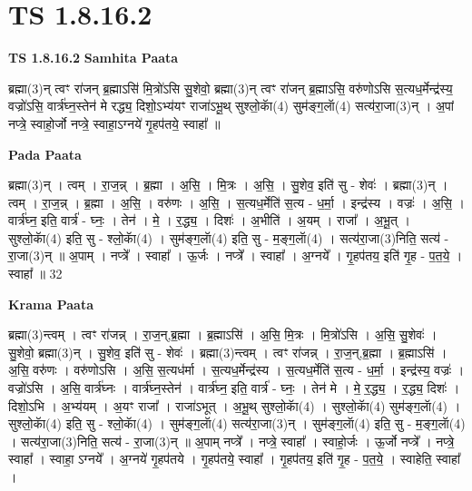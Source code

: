 \documentclass[17pt]{extarticle}
\begin{document}
\section{ TS 1.8.16.2 }

\textbf{TS 1.8.16.2 } \newline
\textbf{Samhita Paata} \newline

ब्रह्मा(3)न् त्वꣳ रा॑जन् ब्र॒ह्माऽसि॑ मि॒त्रो॑ऽसि सु॒शेवो॒ ब्रह्मा(3)न् त्वꣳ रा॑जन् ब्र॒ह्माऽसि॒ वरु॑णोऽसि स॒त्यध॒र्मेन्द्र॑स्य॒ वज्रो॑ऽसि॒ वार्त्र॑घ्न॒स्तेन॑ मे रद्ध्य॒ दिशो॒ऽभ्य॑यꣳ राजा॑ऽभू॒थ् सुश्लो॒काॅ(4) सुम॑ङ्ग॒लाॅ(4) सत्य॑रा॒जा(3)न् । अ॒पां नप्त्रे॒ स्वाहो॒र्जो नप्त्रे॒ स्वाहा॒ऽग्नये॑ गृ॒हप॑तये॒ स्वाहा᳚ ॥ \newline

\textbf{Pada Paata} \newline

ब्रह्मा(3)न् । त्वम् । रा॒ज॒न्न् । ब्र॒ह्मा । अ॒सि॒ । मि॒त्रः । अ॒सि॒ । सु॒शेव॒ इति॑ सु - शेवः॑ । ब्रह्मा(3)न् । त्वम् । रा॒ज॒न्न् । ब्र॒ह्मा । अ॒सि॒ । वरु॑णः । अ॒सि॒ । स॒त्यध॒र्मेति॑ स॒त्य - ध॒र्मा॒ । इन्द्र॑स्य । वज्रः॑ । अ॒सि॒ । वार्त्र॑घ्न॒ इति॒ वार्त्र॑ - घ्नः॒ । तेन॑ । मे॒ । र॒द्ध्य॒ । दिशः॑ । अ॒भीति॑ । अ॒यम् । राजा᳚ । अ॒भू॒त् । सुश्लो॒काॅ(4) इति॒ सु - श्लो॒काॅ(4) । सुम॑ङ्ग॒लाॅ(4) इति॒ सु - म॒ङ्ग॒लाॅ(4) । सत्य॑रा॒जा(3)निति॒ सत्य॑ - रा॒जा(3)न् ॥ अ॒पाम् । नप्त्रे᳚ । स्वाहा᳚ । ऊ॒र्जः । नप्त्रे᳚ । स्वाहा᳚ । अ॒ग्नये᳚ । गृ॒हप॑तय॒ इति॑ गृ॒ह - प॒त॒ये॒ । स्वाहा᳚ ॥ 32  \newline


\textbf{Krama Paata} \newline

ब्रह्मा(3)न्त्वम् । त्वꣳ रा॑जन्न् । रा॒ज॒न्,ब्र॒ह्मा । ब्र॒ह्माऽसि॑ । अ॒सि॒ मि॒त्रः । मि॒त्रो॑ऽसि । अ॒सि॒ सु॒शेवः॑ । सु॒शेवो॒ ब्रह्मा(3)न् । सु॒शेव॒ इति॑ सु - शेवः॑ । ब्रह्मा(3)न्त्वम् । त्वꣳ रा॑जन्न् । रा॒ज॒न्,ब्र॒ह्मा । ब्र॒ह्माऽसि॑ । अ॒सि॒ वरु॑णः । वरु॑णोऽसि । अ॒सि॒ स॒त्यध॑र्मा । स॒त्यध॒र्मेन्द्र॑स्य । स॒त्यध॒र्मेति॑ स॒त्य - ध॒र्मा॒ । इन्द्र॑स्य॒ वज्रः॑ । वज्रो॑ऽसि । अ॒सि॒ वार्त्र॑घ्नः । वार्त्र॑घ्न॒स्तेन॑ । वार्त्र॑घ्न॒ इति॒ वार्त्र॑ - घ्नः॒ । तेन॑ मे । मे॒ र॒द्ध्य॒ । र॒द्ध्य॒ दिशः॑ । दिशो॒ऽभि । अ॒भ्य॑यम् । अ॒यꣳ राजा᳚ । राजा॑ऽभूत् । अ॒भू॒थ् सुश्लो॒काॅ(4) । सुश्लो॒काॅ(4) सुम॑ङ्ग॒लाॅ(4) । सुश्लो॒काॅ(4) इति॒ सु - श्लो॒काॅ(4) । सुम॑ङ्ग॒लाॅ(4) सत्य॑रा॒जा(3)न् । सुम॑ङ्ग॒लाॅ(4) इति॒ सु - म॒ङ्ग॒लाॅ(4) । सत्य॑रा॒जा(3)निति॒ सत्य॑ - रा॒जा(3)न् ॥ अ॒पाम् नप्त्रे᳚ । नप्त्रे॒ स्वाहा᳚ । स्वाहो॒र्जः । ऊ॒र्जो नप्त्रे᳚ । नप्त्रे॒ स्वाहा᳚ । स्वाहा॒ ऽग्नये᳚ । अ॒ग्नये॑ गृ॒हप॑तये । गृ॒हप॑तये॒ स्वाहा᳚ । गृ॒हप॑तय॒ इति॑ गृ॒ह - प॒त॒ये॒ । स्वाहेति॒ स्वाहा᳚ । \newline
\end{document}
